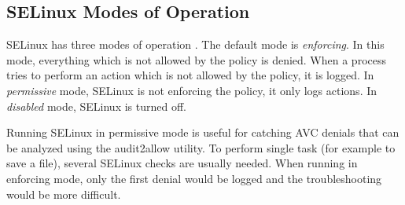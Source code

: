 \subsection{SELinux Modes of Operation}

SELinux has three modes of operation \cite{selinuxguide}. The default mode is
\emph{enforcing}. In this mode, everything which is not allowed by the policy is
denied. When a process tries to perform an action which is not allowed by the
policy, it is logged. In \emph{permissive} mode, SELinux is not enforcing the
policy, it only logs actions. In \emph{disabled} mode, SELinux is turned off.

Running SELinux in permissive mode is useful for catching AVC denials that can
be analyzed using the audit2allow utility. To perform single task (for example
to save a file), several SELinux checks are usually needed. When running in
enforcing mode, only the first denial would be logged and the troubleshooting
would be more difficult.

